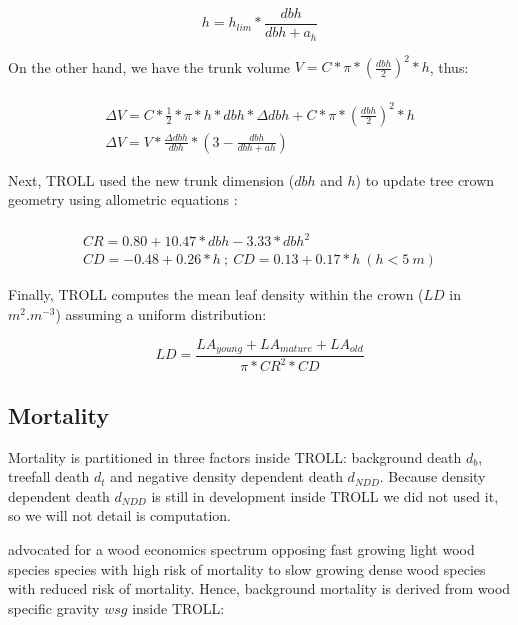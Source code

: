 \documentclass[]{article}
\theoremstyle{definition}
\theoremstyle{definition}
\theoremstyle{remark}
\begin{document}
\begin{equation}
  h = h_{lim}*\frac{dbh}{dbh + a_h}
  \label{eq:h}
\end{equation}

On the other hand, we have the trunk volume
\(V = C * \pi * (\frac{dbh}{2})^2*h\), thus:

\begin{equation}
  \begin{array}{c} \\
    \Delta V = C*\frac{1}{2}*\pi*h*dbh*\Delta dbh + C * \pi * (\frac{dbh}{2})^2*h \\
    \Delta V = V*\frac{\Delta dbh}{dbh}*(3-\frac{dbh}{dbh + ah})
  \end{array}
  \label{eq:Deltadbh}
\end{equation}

Next, TROLL used the new trunk dimension (\(dbh\) and \(h\)) to update
tree crown geometry using allometric equations \citep{Chave2005}:

\begin{equation}
  \begin{array}{c} \\
    CR = 0.80 + 10.47*dbh - 3.33*dbh^2\\
    CD = -0.48 + 0.26*h~;~CD = 0.13 + 0.17*h~(h<5~m)
  \end{array}
  \label{eq:C}
\end{equation}

Finally, TROLL computes the mean leaf density within the crown (\(LD\)
in \(m^2.m^{-3}\)) assuming a uniform distribution:

\begin{equation}
  LD = \frac{LA_{young}+LA_{mature}+LA_{old}}{\pi*CR^2*CD}
  \label{eq:LD}
\end{equation}

\subsection{Mortality}\label{mortality}

Mortality is partitioned in three factors inside TROLL: background death
\(d_b\), treefall death \(d_t\) and negative density dependent death
\(d_{NDD}\). Because density dependent death \(d_{NDD}\) is still in
development inside TROLL we did not used it, so we will not detail is
computation.

\citet{chave_towards_2009} advocated for a wood economics spectrum
opposing fast growing light wood species species with high risk of
mortality to slow growing dense wood species with reduced risk of
mortality. Hence, background mortality is derived from wood specific
gravity \(wsg\) inside TROLL:
\end{document}

